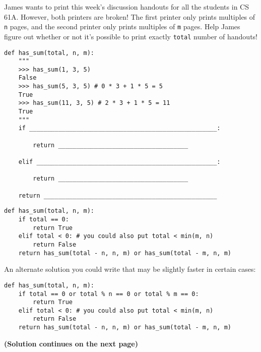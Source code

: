 \begin{blocksection}
\question James wants to print this week's discussion handouts for all the students in CS 61A.
However, both printers are broken! The first printer only prints multiples of \lstinline$n$
pages, and the second printer only prints multiples of \lstinline$m$ pages. Help James figure
out whether or not it's possible to print exactly \lstinline$total$ number of handouts! \\

\begin{lstlisting}
def has_sum(total, n, m):
    """
    >>> has_sum(1, 3, 5)
    False
    >>> has_sum(5, 3, 5) # 0 * 3 + 1 * 5 = 5
    True
    >>> has_sum(11, 3, 5) # 2 * 3 + 1 * 5 = 11
    True
    """
    if ____________________________________________________:

        return ____________________________________

    elif __________________________________________________:

        return ____________________________________

    return ________________________________________________

\end{lstlisting}

\begin{solution}[1.5in]
\begin{lstlisting}
def has_sum(total, n, m):
    if total == 0:
        return True
    elif total < 0: # you could also put total < min(m, n)
        return False
    return has_sum(total - n, n, m) or has_sum(total - m, n, m)
\end{lstlisting}
An alternate solution you could write that may be slightly faster in certain cases:
\begin{lstlisting}
def has_sum(total, n, m):
    if total == 0 or total % n == 0 or total % m == 0:
        return True
    elif total < 0: # you could also put total < min(m, n)
        return False
    return has_sum(total - n, n, m) or has_sum(total - m, n, m)
\end{lstlisting}

\textbf{(Solution continues on the next page)}
\end{solution}
\end{blocksection}

